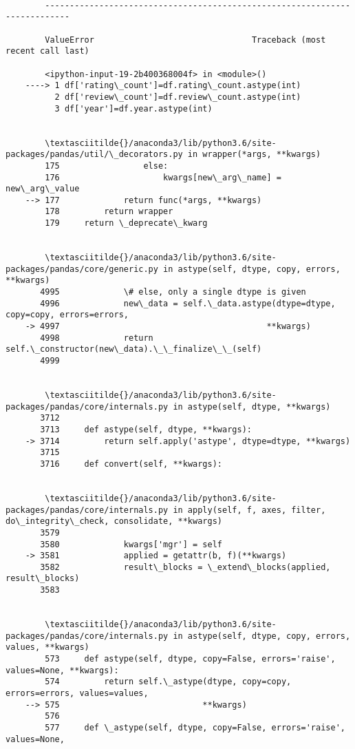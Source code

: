 \documentclass[11pt]{article}
\begin{document}
    \begin{Verbatim}[commandchars=\\\{\}]

        ---------------------------------------------------------------------------

        ValueError                                Traceback (most recent call last)

        <ipython-input-19-2b400368004f> in <module>()
    ----> 1 df['rating\_count']=df.rating\_count.astype(int)
          2 df['review\_count']=df.review\_count.astype(int)
          3 df['year']=df.year.astype(int)


        \textasciitilde{}/anaconda3/lib/python3.6/site-packages/pandas/util/\_decorators.py in wrapper(*args, **kwargs)
        175                 else:
        176                     kwargs[new\_arg\_name] = new\_arg\_value
    --> 177             return func(*args, **kwargs)
        178         return wrapper
        179     return \_deprecate\_kwarg


        \textasciitilde{}/anaconda3/lib/python3.6/site-packages/pandas/core/generic.py in astype(self, dtype, copy, errors, **kwargs)
       4995             \# else, only a single dtype is given
       4996             new\_data = self.\_data.astype(dtype=dtype, copy=copy, errors=errors,
    -> 4997                                          **kwargs)
       4998             return self.\_constructor(new\_data).\_\_finalize\_\_(self)
       4999 


        \textasciitilde{}/anaconda3/lib/python3.6/site-packages/pandas/core/internals.py in astype(self, dtype, **kwargs)
       3712 
       3713     def astype(self, dtype, **kwargs):
    -> 3714         return self.apply('astype', dtype=dtype, **kwargs)
       3715 
       3716     def convert(self, **kwargs):


        \textasciitilde{}/anaconda3/lib/python3.6/site-packages/pandas/core/internals.py in apply(self, f, axes, filter, do\_integrity\_check, consolidate, **kwargs)
       3579 
       3580             kwargs['mgr'] = self
    -> 3581             applied = getattr(b, f)(**kwargs)
       3582             result\_blocks = \_extend\_blocks(applied, result\_blocks)
       3583 


        \textasciitilde{}/anaconda3/lib/python3.6/site-packages/pandas/core/internals.py in astype(self, dtype, copy, errors, values, **kwargs)
        573     def astype(self, dtype, copy=False, errors='raise', values=None, **kwargs):
        574         return self.\_astype(dtype, copy=copy, errors=errors, values=values,
    --> 575                             **kwargs)
        576 
        577     def \_astype(self, dtype, copy=False, errors='raise', values=None,



\end{Verbatim}
\end{document}
